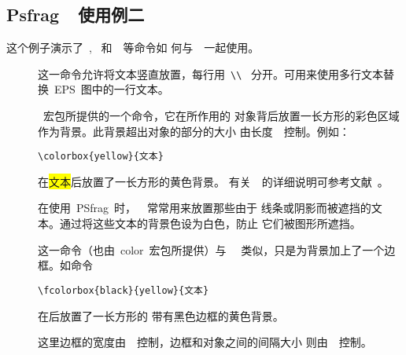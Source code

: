 \subsection{Psfrag~~使用例二}\label{ssec:psfragex2}

这个例子演示了~, ~和~~等命令如
何与~~一起使用。

\begin{description}
\item[] 这一命令允许将文本竖直放置，每行用~\verb+\\+~
     分开。可用来使用多行文本替换~EPS~图中的一行文本。
\item[] ~宏包所提供的一个命令，它在所作用的
     对象背后放置一长方形的彩色区域作为背景。此背景超出对象的部分的大小
     由长度~~控制。例如：
     \begin{Verbatim}[formatcom=\color{VerbatimColor}\CJKfamily{kai}]
         \colorbox{yellow}{文本}
     \end{Verbatim}
     在{\colorbox{yellow}{文本}}后放置了一长方形的黄色背景。
     有关~~的详细说明可参考文献~\cite{grfguide}。

     在使用~\textsf{PSfrag}~时，~~常常用来放置那些由于
     线条或阴影而被遮挡的文本。通过将这些文本的背景色设为白色，防止
     它们被图形所遮挡。
\item[] 这一命令（也由~\textsf{color}~宏包所提供）与
     ~~类似，只是为背景加上了一个边框。如命令
     \begin{Verbatim}[formatcom=\color{VerbatimColor}\CJKfamily{kai}]
         \fcolorbox{black}{yellow}{文本}
     \end{Verbatim}
     在{}后放置了一长方形的
    带有黑色边框的黄色背景。

     这里边框的宽度由~~控制，边框和对象之间的间隔大小
     则由~~控制。
\end{description}

